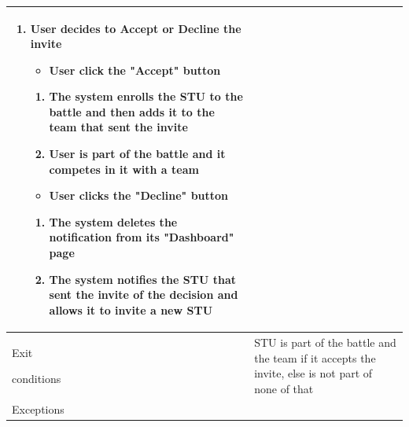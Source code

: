 \begin{center}
\begin{tabular}{| m{2cm} | m{10cm}|}
\begin{enumerate}
                                    \item User decides to Accept or Decline the invite
                                    \begin{itemize}
                                        \item User click the "Accept" button
                                    \end{itemize}
                                        \begin{enumerate}
                                            \item The system enrolls the STU to the battle and then adds it to the team that sent the invite
                                            \item User is part of the battle and it competes in it with a team
                                        \end{enumerate}
                                    \begin{itemize}
                                        \item User clicks the "Decline" button
                                    \end{itemize}
                                        \begin{enumerate}
                                            \item The system deletes the notification from its "Dashboard" page
                                            \item The system notifies the STU that sent the invite of the decision and allows it to invite a new STU
                                        \end{enumerate}
                                \end{enumerate}                                                                                                                                                                                                                                 \\ \hline
        Exit \par conditions  & STU is part of the battle and the team if it accepts the invite, else is not part of none of that                                                                                                                                               \\ \hline
        Exceptions            & \begin{itemize}                                    

\end{itemize}
\end{tabular}
\end{center}
